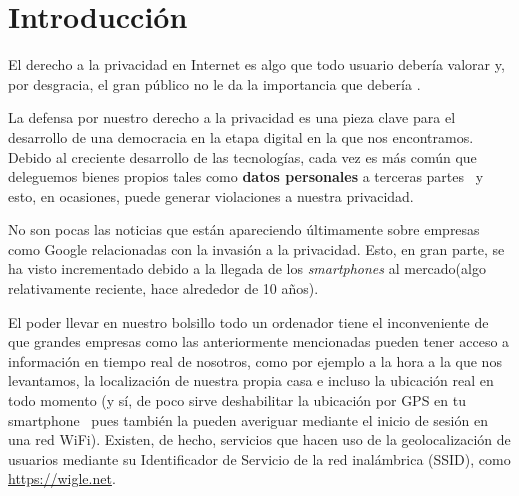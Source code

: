 \chapter{Introducción} 
\label{chap:intro}

\vspace{-0.2cm} 

El derecho a la privacidad en Internet es algo que todo usuario
debería valorar y, por desgracia, el gran público no le da
  la importancia que debería \cite{book:PrivacyBigDataPublicGood}.

La defensa por nuestro derecho a la privacidad es una pieza clave para el desarrollo de una democracia en la etapa digital en la que nos encontramos. Debido al creciente desarrollo de las tecnologías, cada vez es más común que deleguemos bienes propios tales como \textbf{datos personales} a terceras partes~\cite{paper:OECD} y esto, en ocasiones, puede generar violaciones a nuestra privacidad.

No son pocas las noticias que están apareciendo últimamente sobre
empresas como Google relacionadas con la invasión a la
privacidad. Esto, en gran parte, se ha visto incrementado debido a la
llegada de los \textit{smartphones} al mercado(algo relativamente
reciente, hace alrededor de 10 años). 

El poder llevar en nuestro bolsillo todo un ordenador tiene el inconveniente de que grandes empresas como las anteriormente mencionadas pueden tener acceso a
información en tiempo real de nosotros, como por ejemplo a la hora a
la que nos levantamos, la localización de nuestra propia casa e
incluso la ubicación real en todo momento (y sí, de poco sirve
deshabilitar la ubicación por GPS en tu smartphone~\cite{article:GPSTracking} pues también la
pueden averiguar mediante el inicio de sesión en una red WiFi). Existen, de hecho, servicios que hacen uso de la geolocalización de usuarios mediante su Identificador de Servicio de la red inalámbrica (SSID), como \url{https://wigle.net}.

